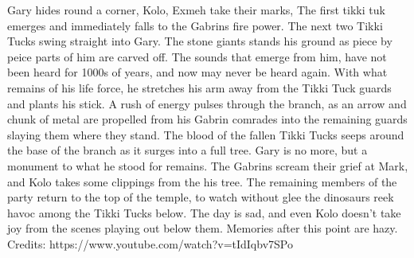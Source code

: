 Gary hides round a corner, Kolo, Exmeh take their marks,\medskip
The first tikki tuk emerges and immediately falls to the Gabrins fire power. The next two Tikki Tucks swing straight into Gary. The stone giants stands his ground as piece by peice parts of him are carved off. The sounds that emerge from him, have not been heard for 1000s of years, and now may never be heard again.\medskip
With what remains of his life force, he stretches his arm away from the Tikki Tuck guards and plants his stick. A rush of energy pulses through the branch, as an arrow and chunk of metal are propelled from his Gabrin comrades into the remaining guards slaying them where they stand. The blood of the fallen Tikki Tucks seeps around the base of the branch as it surges into a full tree. Gary is no more, but a monument to what he stood for remains.\medskip
The Gabrins scream their grief at Mark, and Kolo takes some clippings from the his tree.\medskip
The remaining members of the party return to the top of the temple, to watch without glee the dinosaurs reek havoc among the Tikki Tucks below. The day is sad, and even Kolo doesn’t take joy from the scenes playing out below them.\medskip
Memories after this point are hazy.\medskip
Credits: https://www.youtube.com/watch?v=tIdIqbv7SPo\medskip
